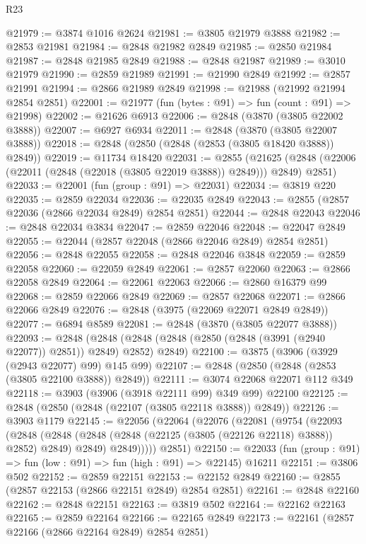 \begin{lexlean}{R23}
\begin{coremodule}
@21979 := @3874 @1016 @2624
@21981 := @3805 @21979 @3888
@21982 := @2853 @21981
@21984 := @2848 @21982 @2849
@21985 := @2850 @21984
@21987 := @2848 @21985 @2849
@21988 := @2848 @21987
@21989 := @3010 @21979
@21990 := @2859 @21989
@21991 := @21990 @2849
@21992 := @2857 @21991
@21994 := @2866 @21989 @2849
@21998 := @21988 (@21992 @21994 @2854 @2851)
@22001 := @21977 (fun (bytes : @91) => fun (count : @91) => @21998)
@22002 := @21626 @6913
@22006 := @2848 (@3870 (@3805 @22002 @3888))
@22007 := @6927 @6934
@22011 := @2848 (@3870 (@3805 @22007 @3888))
@22018 := @2848 (@2850 (@2848 (@2853 (@3805 @18420 @3888)) @2849))
@22019 := @11734 @18420
@22031 := @2855
    (@21625 (@2848 (@22006 (@22011 (@2848 (@22018 (@3805 @22019 @3888)) @2849))) @2849) @2851)
@22033 := @22001 (fun (group : @91) => @22031)
@22034 := @3819 @220
@22035 := @2859 @22034
@22036 := @22035 @2849
@22043 := @2855 (@2857 @22036 (@2866 @22034 @2849) @2854 @2851)
@22044 := @2848 @22043
@22046 := @2848 @22034 @3834
@22047 := @2859 @22046
@22048 := @22047 @2849
@22055 := @22044 (@2857 @22048 (@2866 @22046 @2849) @2854 @2851)
@22056 := @2848 @22055
@22058 := @2848 @22046 @3848
@22059 := @2859 @22058
@22060 := @22059 @2849
@22061 := @2857 @22060
@22063 := @2866 @22058 @2849
@22064 := @22061 @22063
@22066 := @2860 @16379 @99
@22068 := @2859 @22066 @2849
@22069 := @2857 @22068
@22071 := @2866 @22066 @2849
@22076 := @2848 (@3975 (@22069 @22071 @2849 @2849))
@22077 := @6894 @8589
@22081 := @2848 (@3870 (@3805 @22077 @3888))
@22093 := @2848
    (@2848 (@2848 (@2848 (@2850 (@2848 (@3991 (@2940 @22077)) @2851)) @2849) @2852) @2849)
@22100 := @3875 (@3906 (@3929 (@2943 @22077) @99) @145 @99)
@22107 := @2848 (@2850 (@2848 (@2853 (@3805 @22100 @3888)) @2849))
@22111 := @3074 @22068 @22071 @112 @349
@22118 := @3903 (@3906 (@3918 @22111 @99) @349 @99) @22100
@22125 := @2848 (@2850 (@2848 (@22107 (@3805 @22118 @3888)) @2849))
@22126 := @3903 @1179
@22145 := @22056
    (@22064
      (@22076
        (@22081
          (@9754
            (@22093
              (@2848
                (@2848 (@2848 (@2848 (@22125 (@3805 (@22126 @22118) @3888)) @2852) @2849) @2849)
                @2849)))))
      @2851)
@22150 := @22033 (fun (group : @91) => fun (low : @91) => fun (high : @91) => @22145) @16211
@22151 := @3806 @502
@22152 := @2859 @22151
@22153 := @22152 @2849
@22160 := @2855 (@2857 @22153 (@2866 @22151 @2849) @2854 @2851)
@22161 := @2848 @22160
@22162 := @2848 @22151
@22163 := @3819 @502
@22164 := @22162 @22163
@22165 := @2859 @22164
@22166 := @22165 @2849
@22173 := @22161 (@2857 @22166 (@2866 @22164 @2849) @2854 @2851)

\end{coremodule}
\end{lexlean}
